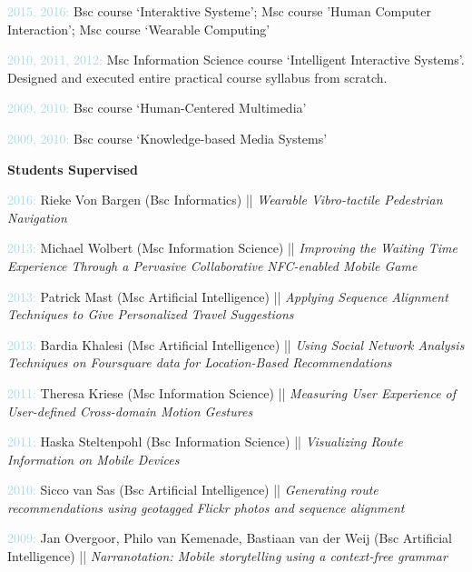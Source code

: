 \documentclass{article}
\newenvironment{innerlist}[1][\enskip\textbullet]%
        {\begin{compactenum}[#1]}{\end{compactenum}}
\begin{document}
\begin{innerlist}[-]

\item \textcolor{lightblue}{2015, 2016:}  Bsc course `Interaktive Systeme'; Msc course 'Human Computer Interaction'; Msc course `Wearable Computing'

\item \textcolor{lightblue}{2010, 2011, 2012:}  Msc Information Science course `Intelligent Interactive Systems'. Designed and executed entire practical course syllabus from scratch.

\item \textcolor{lightblue}{2009, 2010:} Bsc course `Human-Centered Multimedia'

\item \textcolor{lightblue}{2009, 2010:} Bsc course `Knowledge-based Media Systems'

\end{innerlist}

\bigskip

\textbf{Students Supervised}

\begin{innerlist}[-]

\item \textcolor{lightblue}{2016:} Rieke Von Bargen (Bsc Informatics) || \textit{Wearable Vibro-tactile Pedestrian Navigation}
 
\item \textcolor{lightblue}{2013:} Michael Wolbert (Msc Information Science) || \textit{Improving the Waiting Time Experience Through a Pervasive Collaborative NFC-enabled Mobile Game}

\item \textcolor{lightblue}{2013:} Patrick Mast (Msc Artificial Intelligence) ||
 \textit{Applying Sequence Alignment Techniques to Give Personalized Travel Suggestions}
 
\item \textcolor{lightblue}{2013:} Bardia Khalesi (Msc Artificial Intelligence) ||
 \textit{Using Social Network Analysis Techniques on Foursquare data for Location-Based Recommendations}
 
\item \textcolor{lightblue}{2011:} Theresa Kriese (Msc Information Science) ||
 \textit{Measuring User Experience of User-defined Cross-domain Motion Gestures}
 
\item \textcolor{lightblue}{2011:} Haska Steltenpohl (Bsc Information Science) ||
 \textit{Visualizing Route Information on Mobile Devices}


\item \textcolor{lightblue}{2010:} Sicco van Sas (Bsc Artificial Intelligence) ||
 \textit{Generating route recommendations using geotagged Flickr photos and sequence alignment}

\item \textcolor{lightblue}{2009:} Jan Overgoor, Philo van Kemenade, Bastiaan van der Weij (Bsc Artificial Intelligence) ||
\textit{Narranotation: Mobile storytelling using a context-free grammar}

\end{innerlist}
\end{document}
